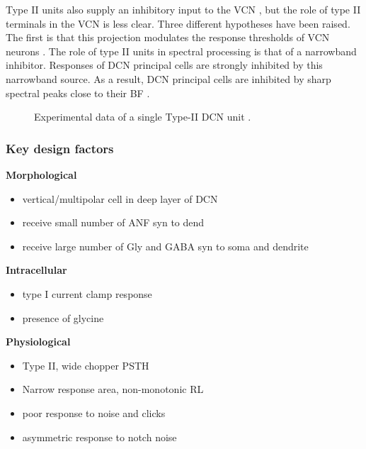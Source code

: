 Type II units also supply an inhibitory input to the VCN
\citep{WickesbergOertel:1990}, but the role of type II terminals in
the VCN is less clear. Three different hypotheses have been
raised. The ﬁrst is that this projection modulates the response
thresholds of VCN neurons \citep{PaoliniClark:1998}.  The role of type
II units in spectral processing is that of a narrowband
inhibitor. Responses of DCN principal cells are strongly inhibited by
this narrowband source. As a result, DCN principal cells are inhibited
by sharp spectral peaks close to their BF
\citep{SpirouDavisEtAl:1999}.

\begin{figure}[htb]
  \centering
{}
\caption{Experimental data of a single Type-II DCN unit \citep[Fig.~1]{SpirouDavisEtAl:1999}.}
  \label{fig:SpirouFig1}
\end{figure}


\subsubsection{Key design factors}


\textbf{Morphological}
\begin{itemize}
\item vertical/multipolar cell in deep layer of DCN \citep{Rhode:1999}
\item receive small number of ANF syn to dend
\item receive large number of Gly and GABA syn to soma and dendrite
\end{itemize}

\textbf{Intracellular}
\begin{itemize}
\item type I current clamp response
\item presence of glycine \citep{OertelWickesberg:1993}
\end{itemize}


\textbf{Physiological}
\begin{itemize}
\item Type II, wide chopper PSTH
  \citep{Rhode:1999,SpirouDavisEtAl:1999}
\item Narrow response area, non-monotonic RL
\item poor response to noise and clicks
\item asymmetric response to notch noise \citep{ReissYoung:2005}
\end{itemize}


